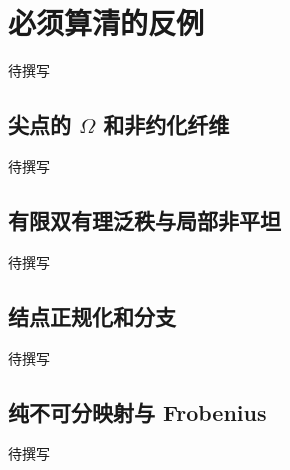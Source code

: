 
% 
% 
% 

\section{必须算清的反例}
\label{g5:sec:1505}

待撰写

\subsection{\texorpdfstring{尖点的 \(\Omega\) 和非约化纤维}{尖点的 \GeometryPdfOmega{} 和非约化纤维}}
\label{g5:subsec:1505:01}
待撰写

\subsection{有限双有理泛秩与局部非平坦}
\label{g5:subsec:1505:02}
待撰写

\subsection{结点正规化和分支}
\label{g5:subsec:1505:03}
待撰写

\subsection{纯不可分映射与 Frobenius}
\label{g5:subsec:1505:04}
待撰写
